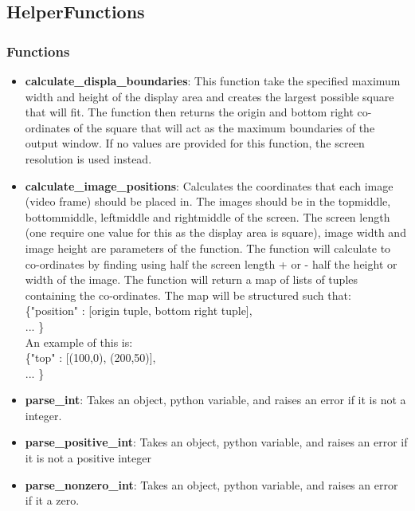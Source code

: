 \documentclass{article}
\begin{document}
\subsection{HelperFunctions}
\subsubsection{Functions}

\begin{itemize}
	\item \textbf{calculate\_displa\_boundaries}: This function take the specified maximum width and height of the display area and creates the largest possible square that will fit. The function then returns the origin and bottom right co-ordinates of the square that will act as the maximum boundaries of the output window. If no values are provided for this function, the screen resolution is used instead.
	
	\item \textbf{calculate\_image\_positions}: Calculates the co\-ordinates that each image (video frame) should be placed in. The images should be in the top\-middle, bottom\-middle, left\-middle and right\-middle of the screen. The screen length (one require one value for this as the display area is square), image width and image height are parameters of the function. The function will calculate to co-ordinates by finding using half the screen length + or - half the height or width of the image. The function will return a map of lists of tuples containing the co-ordinates. The map will be structured such that: \\
	\{"position" : [origin tuple, bottom right tuple],\\... \} \\
	An example of this is: \\
	\{"top" : [(100,0), (200,50)],\\... \}

	\item \textbf{parse\_int}: Takes an object, python variable, and raises an error if it is not a integer. 	
	
	\item \textbf{parse\_positive\_int}: Takes an object, python variable, and raises an error if it is not a positive integer

	\item \textbf{parse\_nonzero\_int}: Takes an object, python variable, and raises an error if it a zero. 

\end{itemize}
\end{document}
